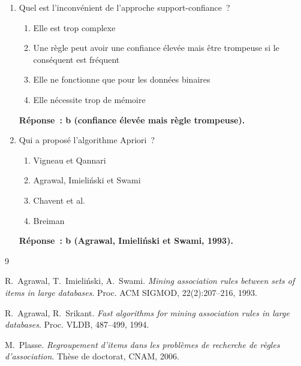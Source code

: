 \documentclass[a4paper,11pt]{article}
\theoremstyle{definition}
\theoremstyle{remark}
\begin{document}
\begin{enumerate}
  \item Quel est l'inconv\'enient de l'approche support-confiance~?
    \begin{enumerate}
      \item Elle est trop complexe
      \item Une r\`egle peut avoir une confiance \'elev\'ee mais
        \^etre trompeuse si le cons\'equent est fr\'equent
      \item Elle ne fonctionne que pour les donn\'ees binaires
      \item Elle n\'ecessite trop de m\'emoire
    \end{enumerate}
    \textbf{R\'eponse~: b (confiance \'elev\'ee mais r\`egle
    trompeuse).}

  \item Qui a propos\'e l'algorithme Apriori~?
    \begin{enumerate}
      \item Vigneau et Qannari
      \item Agrawal, Imieli\'nski et Swami
      \item Chavent et al.
      \item Breiman
    \end{enumerate}
    \textbf{R\'eponse~: b (Agrawal, Imieli\'nski et Swami, 1993).}

\end{enumerate}

\begin{thebibliography}{9}

  R.~Agrawal, T.~Imieli\'nski, A.~Swami.
  \newblock \emph{Mining association rules between sets of items in
    large databases}.
  \newblock Proc. ACM SIGMOD, 22(2):207--216, 1993.

  R.~Agrawal, R.~Srikant.
  \newblock \emph{Fast algorithms for mining association rules in
    large databases}.
  \newblock Proc. VLDB, 487--499, 1994.

  M.~Plasse.
  \newblock \emph{Regroupement d'items dans les probl\`emes de
    recherche de r\`egles d'association}.
  \newblock Th\`ese de doctorat, CNAM, 2006.

\end{thebibliography}
\end{document}

